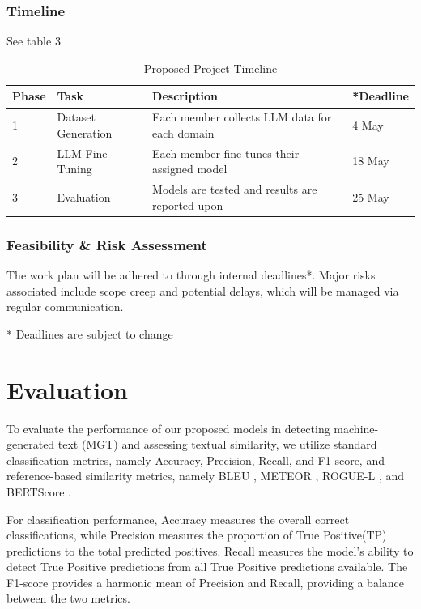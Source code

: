 \documentclass[11pt, a4paper,twocolumn]{article}
\begin{document}
\subsubsection{Timeline}
See table 3
\begin{table}[tp]
\centering
\begin{tabular}{l l >{\raggedright\arraybackslash}p{8.5cm} l}
\toprule
\textbf{Phase} & \textbf{Task} & \textbf{Description} & \textbf{*Deadline}\\
\midrule
1
    & Dataset Generation
    & Each member collects LLM data for each domain
    & 4 May \\
2 
    & LLM Fine Tuning
    & Each member fine-tunes their assigned model
    & 18 May \\
3 
    & Evaluation
    & Models are tested and results are reported upon
    & 25 May  \\
\bottomrule
\end{tabular}
\caption{Proposed Project Timeline}
\end{table}

\subsubsection{Feasibility \& Risk Assessment}
The work plan will be adhered to through internal deadlines*. Major risks associated include scope creep and potential delays, which will be managed via regular communication.

* Deadlines are subject to change
    
    \section{Evaluation}
    To evaluate the performance of our proposed models in detecting machine-generated text (MGT) and assessing textual similarity, we utilize standard classification metrics, namely Accuracy, Precision, Recall, and F1-score, and reference-based similarity metrics, namely BLEU \citep{papineni2002bleu}, METEOR \citep{banerjee2005meteor}, ROGUE-L \citep{lin2004rouge}, and BERTScore \citep{zhang2019bertscore}.

For classification performance, Accuracy measures the overall correct classifications, while Precision measures the proportion of True Positive(TP) predictions to the total predicted positives. Recall measures the model's ability to detect True Positive predictions from all True Positive predictions available. The F1-score provides a harmonic mean of Precision and Recall, providing a balance between the two metrics.
\end{document}
